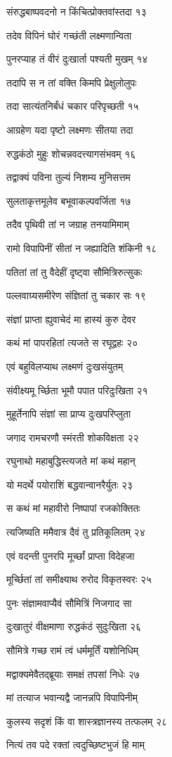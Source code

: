 संरुद्धबाष्पवदनो न किंचित्प्रोक्तवांस्तदा १३

तदेव विपिनं घोरं गच्छंती लक्ष्मणान्विता

पुनरप्याह तं वीरं दुःखार्ता पश्यती मुखम् १४

तदापि स न तां वक्ति किमपि प्रेक्षुलोलुपः

तदा सात्यंतनिर्बंधं चकार परिपृच्छती १५

आग्रहेण यदा पृष्टो लक्ष्मणः सीतया तदा

रुद्धकंठो मुहुः शोचन्नवदत्त्यागसंभवम् १६

तद्वाक्यं पविना तुल्यं निशम्य मुनिसत्तम

सुलताकृत्तमूलेव बभूवाकल्पवर्जिता १७

तदैव पृथिवी तां न जग्राह तनयामिमाम्

रामो विपापिनीं सीतां न जह्यादिति शंकिनी १८

पतितां तां तु वैदेहीं दृष्ट्वा सौमित्रिरुत्सुकः

पल्लवाग्र्यसमीरेण संज्ञितां तु चकार सः १९

संज्ञां प्राप्ता ह्युवाचेदं मा हास्यं कुरु देवर

कथं मां पापरहितां त्यजते स रघूद्वहः २०

एवं बहुविलप्याथ लक्ष्मणं दुःखसंयुतम्

संवीक्ष्यमू र्च्छिता भूमौ पपात परिदुःखिता २१

मुहूर्तेनापि संज्ञां सा प्राप्य दुःखपरिप्लुता

जगाद रामचरणौ स्मंरती शोकविक्षता २२

रघुनाथो महाबुद्धिस्त्यजते मां कथं महान्

यो मदर्थे पयोराशिं बद्धवान्वानरैर्युतः २३

स कथं मां महावीरो निष्पापां रजकोक्तितः

त्यजिष्यति ममैवात्र दैवं तु प्रतिकूलितम् २४

एवं वदन्ती पुनरपि मूर्च्छां प्राप्ता विदेहजा

मूर्च्छितां तां समीक्ष्याथ रुरोद विकृतस्वरः २५

पुनः संज्ञामवाप्यैवं सौमित्रिं निजगाद सा

दुःखातुरं वीक्षमाणा रुद्धकंठं सुदुःखिता २६

सौमित्रे गच्छ रामं त्वं धर्ममूर्तिं यशोनिधिम्

मद्वाक्यमेवैतद्ब्रूयाः समक्षं तपसां निधेः २७

मां तत्याज भवान्यद्वै जानन्नपि विपापिनीम्

कुलस्य सदृशं किं वा शास्त्रज्ञानस्य तत्फलम् २८

नित्यं तव पदे रक्तां त्वदुच्छिष्टभुजं हि माम्

